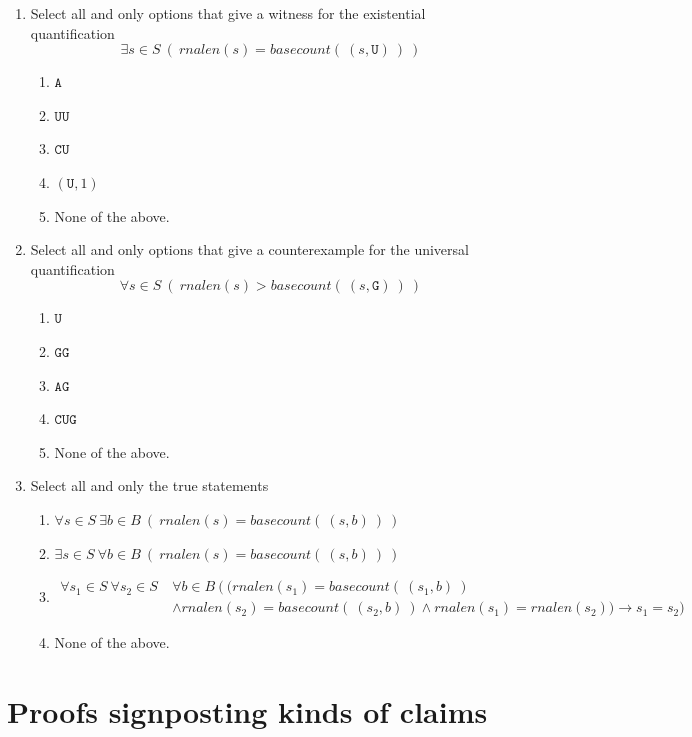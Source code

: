 \documentclass[12pt, oneside]{article}
\newcommand{\A}[0]{\texttt{A}}
\newcommand{\C}[0]{\texttt{C}}
\newcommand{\G}[0]{\texttt{G}}
\newcommand{\U}[0]{\texttt{U}}
\begin{document}
\begin{enumerate}
    \item Select all and only options that give a witness for the existential quantification
    $$\exists s \in S ~(~rnalen(s) = basecount(~(s,\U)~)~)$$
    \begin{enumerate}
    \item $\A$
    \item $\U\U$
    \item $\C\U$
    \item $(\U, 1)$
    \item None of the above.
    \end{enumerate}
    
    \item Select all and only options that give a counterexample for the universal quantification
    $$\forall s \in S ~(~rnalen(s) > basecount(~(s,\G)~)~)$$
    \begin{enumerate}
    \item $\U$
    \item $\G\G$
    \item $\A\G$
    \item $\C\U\G$
    \item None of the above.
    \end{enumerate}
    
    \item Select all and only the true statements
    \begin{enumerate}
    \item $\forall s \in S ~\exists b \in B ~\left(~rnalen(s) = basecount(~(s,b)~)~ \right)$
    \item $\exists s \in S ~\forall b \in B ~\left(~rnalen(s) = basecount(~(s,b)~)~ \right)$
    \item \begin{align*} \forall s_1 \in S~\forall s_2 \in S ~&\forall b \in B ~\big( ~\big( rnalen(s_1) = basecount(~(s_1,b)~) \\
    &\land rnalen(s_2) = basecount(~(s_2,b)~) \land rnalen(s_1) = rnalen(s_2) \big) \to s_1 = s_2  \big)\end{align*}
    \item None of the above.
    \end{enumerate}
    
\end{enumerate} \vfill
\section*{Proofs signposting kinds of claims}
\end{document}
